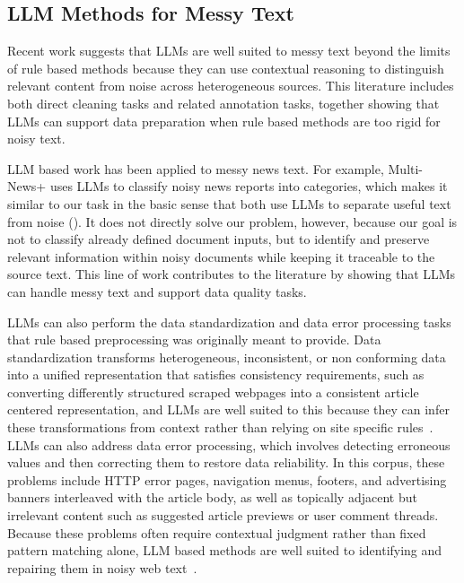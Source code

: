 \documentclass{article}
\begin{document}
\subsection{LLM Methods for Messy
Text}\label{llm-methods-for-messy-text}


Recent work suggests that LLMs are well suited to messy text beyond the limits of rule based methods because they can use contextual reasoning to distinguish relevant content from noise across heterogeneous sources. This literature includes both direct cleaning tasks and related annotation tasks, together showing that LLMs can support data preparation when rule based methods are too rigid for noisy text.

LLM based work has been applied to messy news text. For example, Multi-News+ uses LLMs to classify noisy news reports into categories, which makes it similar to our task in the basic sense that both use LLMs to separate useful text from noise (\cite{Choi_etal2024}). It does not directly solve our problem, however, because our goal is not to classify already defined document inputs, but to identify and preserve relevant information within noisy documents while keeping it traceable to the source text. This line of work contributes to the literature by showing that LLMs can handle messy text and support data quality tasks.

LLMs can also perform the data standardization and data error processing tasks that rule based preprocessing was originally meant to provide. Data standardization transforms heterogeneous, inconsistent, or non conforming data into a unified representation that satisfies consistency requirements, such as converting differently structured scraped webpages into a consistent article centered representation, and LLMs are well suited to this because they can infer these transformations from context rather than relying on site specific rules~\cite{Ma_etal2023,Zhang_etal2024}. LLMs can also address data error processing, which involves detecting erroneous values and then correcting them to restore data reliability. In this corpus, these problems include HTTP error pages, navigation menus, footers, and advertising banners interleaved with the article body, as well as topically adjacent but irrelevant content such as suggested article previews or user comment threads. Because these problems often require contextual judgment rather than fixed pattern matching alone, LLM based methods are well suited to identifying and repairing them in noisy web text~\cite{Choi_etal2024,Biester_etal2024,Li_etal2024,Yan_etal2024}.
\end{document}
